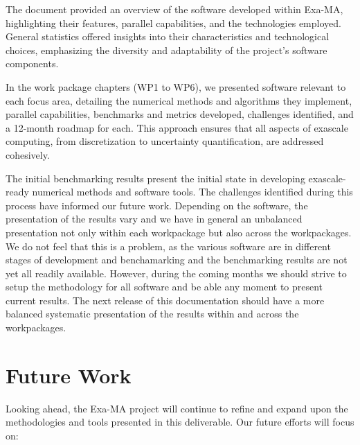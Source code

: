 The document provided an overview of the software developed within Exa-MA, highlighting their features, parallel capabilities, and the technologies employed. General statistics offered insights into their characteristics and technological choices, emphasizing the diversity and adaptability of the project's software components.

In the work package chapters (WP1 to WP6), we presented software relevant to each focus area, detailing the numerical methods and algorithms they implement, parallel capabilities, benchmarks and metrics developed, challenges identified, and a 12-month roadmap for each. 
This  approach ensures that all aspects of exascale computing, from discretization to uncertainty quantification, are addressed cohesively.

The initial benchmarking results present the initial state in developing exascale-ready numerical methods and software tools. 
The challenges identified during this process have informed our future work.
Depending on the software, the presentation of the results vary and we have in general an unbalanced presentation not only within each workpackage  but also across the workpackages.
We do not feel that this is a problem, as the various software are in different stages of development and benchamarking and the benchmarking results are not yet all readily available.
However, during the coming months we should strive to setup the methodology for all software and be able any moment to present current results.
The next release of this documentation should have a more balanced systematic presentation of the results within and across the workpackages.


\section*{Future Work}

Looking ahead, the Exa-MA project will continue to refine and expand upon the methodologies and tools presented in this deliverable. 
Our future efforts will focus on:

